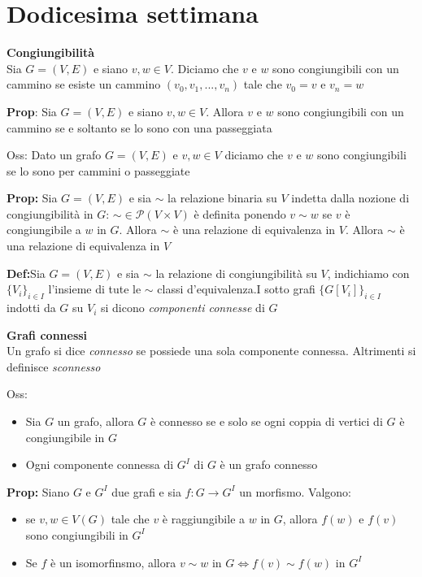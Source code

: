 \documentclass[11pt, letterpaper]{article}
\begin{document}
\newpage
\section{Dodicesima settimana}
\textbf{Congiungibilità}\\ Sia $G=(V,E)$ e siano $v,w\in V$. Diciamo che $v$ e $w$ sono congiungibili con un cammino
se esiste un cammino $(v_{0},v_{1},...,v_{n})$ tale che $v_{0}=v$ e $v_{n}=w$

\textbf{Prop}: Sia $G=(V,E)$ e siano $v,w\in V$. Allora $v$ e $w$ sono congiungibili con un cammino se e soltanto 
se lo sono con una passeggiata

Oss: Dato un grafo $G=(V,E)$ e $v,w\in V$ diciamo che $v$ e $w$ sono congiungibili se lo sono per cammini o
passeggiate

\textbf{Prop:} Sia $G=(V,E)$ e sia $\sim$ la relazione binaria su $V$ indetta dalla nozione di congiungibilità
in $G$: $\sim\in\mathcal{P}(V\times V)$ è definita ponendo $v\sim w$ se $v$ è congiungibile a $w$ in $G$.
Allora $\sim$ è una relazione di equivalenza in $V$. Allora $\sim$ è una relazione di equivalenza in $V$

\textbf{Def:}Sia $G=(V,E)$ e  sia $\sim$ la relazione di congiungibilità su $V$, indichiamo con $\{V_{i}\}_{i\in I}$
l'insieme di tute le $\sim$ classi d'equivalenza.I sotto grafi $\{G[V_{i}]\}_{i\in I}$ indotti  da $G$ su $V_{i}$
si dicono \textit{componenti connesse} di $G$

\textbf{Grafi connessi}\\Un grafo si dice \textit{connesso} se possiede una sola componente connessa. Altrimenti
si definisce \textit{sconnesso}

Oss:
\begin{itemize}
    \item Sia $G$ un grafo, allora $G$ è connesso se e solo se ogni coppia di vertici di $G$ è congiungibile
    in $G$
    \item Ogni componente connessa di $G^{I}$ di $G$ è un grafo connesso
\end{itemize}

\textbf{Prop:} Siano $G$ e $G^{I}$ due grafi e sia $f:G\to G^{I}$ un morfismo. Valgono:
\begin{itemize}
    \item se $v,w\in V(G)$ tale che $v$ è raggiungibile a $w$ in $G$, allora $f(w)$ e $f(v)$ sono 
    congiungibili in $G^{I}$
    \item Se $f$ è un isomorfinsmo, allora $v\sim w$ in $G\Leftrightarrow f(v)\sim f(w)$ in $G^{I}$
\end{itemize}
\end{document}
